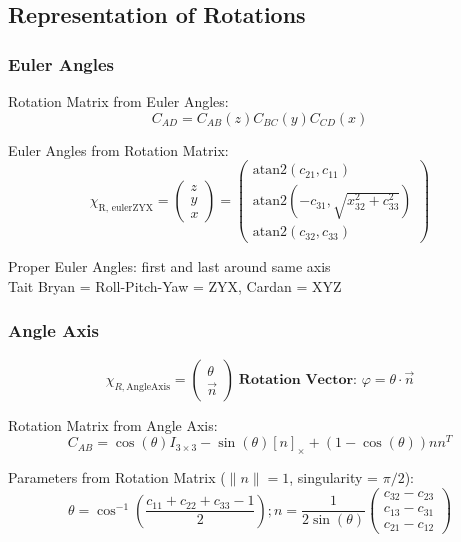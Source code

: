 \documentclass[fontsize=6pt,DIV=calc,a4paper,ngerman]{scrartcl}
\begin{document}
\begin{multicols*}{4}
	\subsection{Representation of Rotations}
	\subsubsection{Euler Angles}

	Rotation Matrix from Euler Angles:
	$$ C_{AD} = C_{AB}(z) C_{BC}(y) C_{CD}(x) $$

	Euler Angles from Rotation Matrix:
	$$\chi_{\text{R, eulerZYX}}
		= \begin{pmatrix} z \\ y \\ x \end{pmatrix}
		= \begin{pmatrix}
			\text{atan2}(c_{21}, c_{11})                      \\
			\text{atan2}(-c_{31}, \sqrt{x_{32}^2 + c_{33}^2}) \\
			\text{atan2}(c_{32}, c_{33})
		\end{pmatrix}
	$$

	Proper Euler Angles: first and last around same axis \\
	Tait Bryan = Roll-Pitch-Yaw = ZYX, Cardan = XYZ


	\subsubsection{Angle Axis}
	$$\chi_{R,\text{AngleAxis}}=\begin{pmatrix}\theta \\ \overrightarrow{n}\end{pmatrix} \; \textbf{Rotation Vector: } \varphi = \theta\cdot\overrightarrow{n}$$

	Rotation Matrix from Angle Axis:
	$$ C_{AB} = \cos(\theta) I_{3\times3} - \sin(\theta) [n]_\times  + (1- \cos(\theta)) nn^T $$

	Parameters from Rotation Matrix ($\|n\| = 1$, singularity = $\pi / 2$):
	$$ \theta = \cos^{-1} \left( \frac{c_{11} + c_{22} + c_{33} - 1}{2} \right);
		n = \frac{1}{2\sin(\theta)}
		\begin{pmatrix}
			c_{32} - c_{23} \\
			c_{13} - c_{31} \\
			c_{21} - c_{12}
		\end{pmatrix} $$


\end{multicols*}
\end{document}
